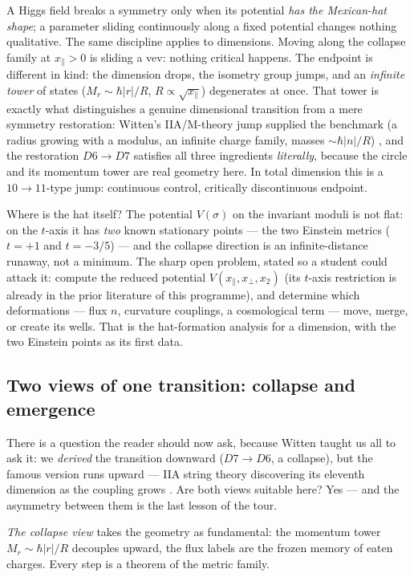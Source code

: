 \documentclass[11pt]{article}
\newcommand{\hb}{\hbar}
\begin{document}
A Higgs field breaks a symmetry only when its potential \emph{has the Mexican-hat shape}; a
parameter sliding continuously along a fixed potential changes nothing qualitative. The same
discipline applies to dimensions. Moving along the collapse family at $x_\parallel>0$ is
sliding a vev: nothing critical happens. The endpoint is different in kind: the dimension
drops, the isometry group jumps, and an \emph{infinite tower} of states
($M_r \sim \hb|r|/R$, $R\propto\sqrt{x_\parallel}$) degenerates at once. That tower is
exactly what distinguishes a genuine dimensional transition from a mere symmetry
restoration: Witten's IIA/M-theory jump supplied the benchmark (a radius growing with a
modulus, an infinite charge family, masses $\sim \hb|n|/R$) \cite{Witten95}, and the
restoration $D6\to D7$ satisfies all three ingredients \emph{literally}, because the circle
and its momentum tower are real geometry here. In total dimension this is a $10\to11$-type
jump: continuous control, critically discontinuous endpoint.

Where is the hat itself? The potential $V(\sigma)$ on the invariant moduli is not flat: on
the $t$-axis it has \emph{two} known stationary points --- the two Einstein metrics
($t=+1$ and $t=-3/5$) --- and the collapse direction is an infinite-distance runaway, not a
minimum. The sharp open problem, stated so a student could attack it: compute the reduced
potential $V(x_\parallel,x_\perp,x_2)$ (its $t$-axis restriction is already in the prior
literature of this programme), and determine which deformations --- flux $n$, curvature
couplings, a cosmological term --- move, merge, or create its wells. That is the
hat-formation analysis for a dimension, with the two Einstein points as its first data.

\subsection{Two views of one transition: collapse and emergence}

There is a question the reader should now ask, because Witten taught us all to ask it: we
\emph{derived} the transition downward ($D7\to D6$, a collapse), but the famous version runs
upward --- IIA string theory discovering its eleventh dimension as the coupling grows
\cite{Witten95}. Are both views suitable here? Yes --- and the asymmetry between them is the
last lesson of the tour.

\emph{The collapse view} takes the geometry as fundamental: the momentum tower
$M_r\sim\hb|r|/R$ decouples upward, the flux labels are the frozen memory of eaten charges.
Every step is a theorem of the metric family.
\end{document}
